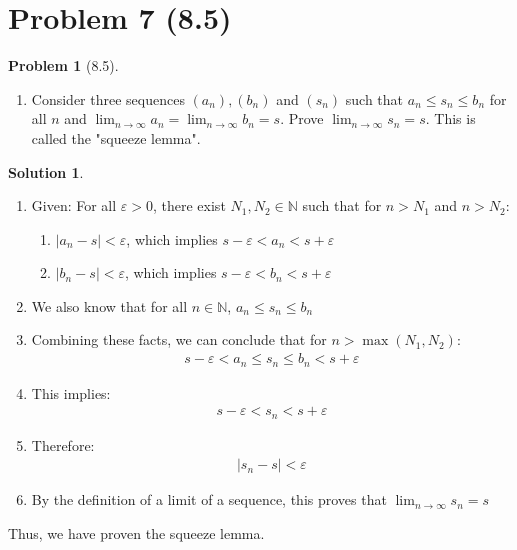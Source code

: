 \documentclass[12pt]{article}
\theoremstyle{definition} %
\newtheorem{solution}{Solution}
\newtheorem{problem}{Problem}
\theoremstyle{plain} %
\begin{document}
  \section*{Problem 7 (8.5)}
  \begin{problem}[8.5]
   \begin{enumerate}
      \item Consider three sequences $(a_{n}), (b_n)$ and $(s_{n})$ such that $a_{n}\leq s_{n}\leq b_{n}$ for all $n$ and $\lim_{ n \to \infty }a_{n}=\lim_{ n \to \infty }b_{n}=s$. Prove $\lim_{ n \to \infty }s_{n}=s$. This is called the "squeeze lemma".
  \end{enumerate}
    
  \end{problem}
  \begin{solution}
       \begin{enumerate}
          \item Given: For all $\varepsilon > 0$, there exist $N_1, N_2 \in \mathbb{N}$ such that for $n > N_1$ and $n > N_2$:
          \begin{enumerate}
              \item $|a_n - s| < \varepsilon$, which implies $s - \varepsilon < a_n < s + \varepsilon$
              \item $|b_n - s| < \varepsilon$, which implies $s - \varepsilon < b_n < s + \varepsilon$
          \end{enumerate}
          \item We also know that for all $n \in \mathbb{N}$, $a_n \leq s_n \leq b_n$
          \item Combining these facts, we can conclude that for $n > \max(N_1, N_2)$:
          \begin{align}
          s - \varepsilon < a_n \leq s_n \leq b_n < s + \varepsilon
          \end{align}
          \item This implies:
          \begin{align}
          s - \varepsilon < s_n < s + \varepsilon
          \end{align}
          \item Therefore:
          \begin{align}
          |s_n - s| < \varepsilon
          \end{align}
          \item By the definition of a limit of a sequence, this proves that $\lim_{n \to \infty} s_n = s$
      \end{enumerate}
      Thus, we have proven the squeeze lemma. 
  

\end{solution}
\end{document}
